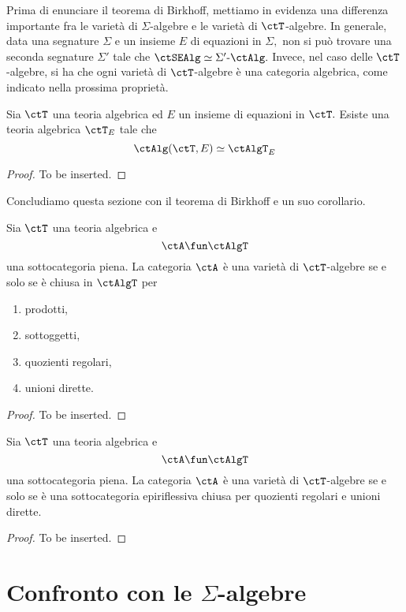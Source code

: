 Prima di enunciare il teorema di Birkhoff, mettiamo in evidenza una differenza importante fra le varietà di $\Sigma$-algebre e le varietà di
$\ctT$-algebre. In generale, data una segnature $\Sigma$ e un insieme $E$ di equazioni in $\Sigma,$ non si può trovare una seconda
segnature $\Sigma'$ tale che $\ctSEAlg \simeq \Sigma'\mbox{-}\ctAlg.$ Invece, nel caso delle $\ctT$-algebre, si ha che ogni varietà di 
$\ctT$-algebre è una categoria algebrica, come indicato nella prossima proprietà.

\begin{proposition}\label{prop_var_alg_alg}
Sia $\ctT$ una teoria algebrica ed $E$ un insieme di equazioni in $\ctT.$ Esiste una teoria algebrica $\ctT_E$ tale che
$$\ctAlg(\ctT,E) \simeq \ctAlgT_{E}$$
\end{proposition}

\begin{proof}
To be inserted.
\end{proof}

Concludiamo questa sezione con il teorema di Birkhoff e un suo corollario.

\begin{theorem}\label{teo_Birkhoff_AlgT}
Sia $\ctT$ una teoria algebrica e 
$$\ctA \fun \ctAlgT$$
una sottocategoria piena. La categoria $\ctA$ è una varietà di $\ctT$-algebre se e solo se è chiusa in $\ctAlgT$ per
\begin{enumerate}
\item prodotti,
\item sottoggetti,
\item quozienti regolari,
\item unioni dirette.
\end{enumerate}
\end{theorem}

\begin{proof}
To be inserted.
\end{proof}

\begin{corollary}\label{cor_th_Birkhoff_AlgT}
Sia $\ctT$ una teoria algebrica e 
$$\ctA \fun \ctAlgT$$
una sottocategoria piena. La categoria $\ctA$ è una varietà di $\ctT$-algebre se e solo se è una sottocategoria epiriflessiva
chiusa per quozienti regolari e unioni dirette.
\end{corollary}

\begin{proof}
To be inserted.
\end{proof}

\section{Confronto con le $\Sigma$-algebre}\label{sec_confr_sigma_T}

